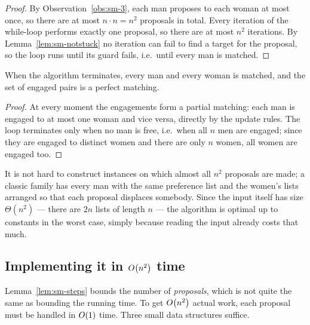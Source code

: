 \begin{proof}
By Observation~\ref{obs:sm-3}, each man proposes to each woman at most once, so
there are at most $n \cdot n = n^2$ proposals in total. Every iteration of the
while-loop performs exactly one proposal, so there are at most $n^2$
iterations. By Lemma~\ref{lem:sm-notstuck} no iteration can fail to find a target
for the proposal, so the loop runs until its guard fails, i.e.\ until every
man is matched.
\end{proof}

\begin{lemma}\label{lem:sm-perfect}
When the algorithm terminates, every man and every woman is matched, and the
set of engaged pairs is a perfect matching.
\end{lemma}

\begin{proof}
At every moment the engagements form a partial matching: each man is engaged
to at most one woman and vice versa, directly by the update rules. The loop
terminates only when no man is free, i.e.\ when all $n$ men are engaged; since
they are engaged to distinct women and there are only $n$ women, all women are
engaged too.
\end{proof}

\begin{remark}
It is not hard to construct instances on which almost all $n^2$ proposals are
made; a classic family has every man with the same preference list and the
women's lists arranged so that each proposal displaces somebody. Since the
input itself has size $\Theta(n^2)$ --- there are $2n$ lists of length $n$ ---
the algorithm is optimal up to constants in the worst case, simply because
reading the input already costs that much.
\end{remark}

\subsection{\texorpdfstring{Implementing it in $O\!\left(n^2\right)$ time}{Implementing it in quadratic time}}\label{sec:sm-impl}

Lemma~\ref{lem:sm-steps} bounds the number of \emph{proposals}, which is not
quite the same as bounding the running time. To get $O\!\left(n^2\right)$ actual
work, each proposal must be handled in $O\!\left(1\right)$ time. Three small data
structures suffice.

